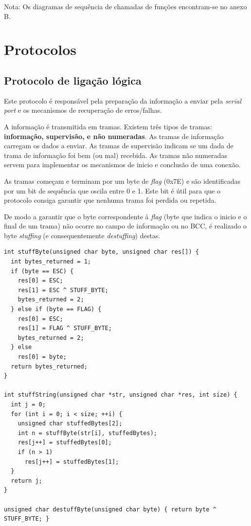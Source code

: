 \documentclass[11pt]{report}
\begin{document}
Nota: Os diagramas de sequência de chamadas de funções encontram-se no anexo B.

{\let\clearpage\relax \chapter{Protocolos}}

\section{Protocolo de ligação lógica}

Este protocolo é responsável pela preparação da informação a enviar pela
\textit{serial port} e os mecanismos de recuperação de erros/falhas.

A informação é transmitida em tramas. Existem três tipos de tramas:
\textbf{informação, supervisão, e não numeradas}. As tramas de informação
carregam os dados a enviar. As tramas de supervisão indicam se um dada de
trama de informação foi bem (ou mal) recebida. As tramas não numeradas servem
para implementar os mecanismos de inicio e conclusão de uma conexão.

As tramas começam e terminam por um byte de \textit{flag} (0x7E) e são
identificadas por um bit de sequência que oscila entre 0 e 1. Este bit é útil
para que o protocolo consiga garantir que nenhuma trama foi perdida ou repetida.

De modo a garantir que o byte correspondente à \textit{flag} (byte que indica
o inicio e o final de um trama) não ocorre no campo de informação ou no BCC,
é realizado o byte \textit{stuffing} (e consequentemente \textit{destuffing})
destas.
\begin{lstlisting}
int stuffByte(unsigned char byte, unsigned char res[]) {
  int bytes_returned = 1;
  if (byte == ESC) {
    res[0] = ESC;
    res[1] = ESC ^ STUFF_BYTE;
    bytes_returned = 2;
  } else if (byte == FLAG) {
    res[0] = ESC;
    res[1] = FLAG ^ STUFF_BYTE;
    bytes_returned = 2;
  } else
    res[0] = byte;
  return bytes_returned;
}

int stuffString(unsigned char *str, unsigned char *res, int size) {
  int j = 0;
  for (int i = 0; i < size; ++i) {
    unsigned char stuffedBytes[2];
    int n = stuffByte(str[i], stuffedBytes);
    res[j++] = stuffedBytes[0];
    if (n > 1)
      res[j++] = stuffedBytes[1];
  }
  return j;
}

unsigned char destuffByte(unsigned char byte) { return byte ^ STUFF_BYTE; }
\end{lstlisting}
\end{document}
